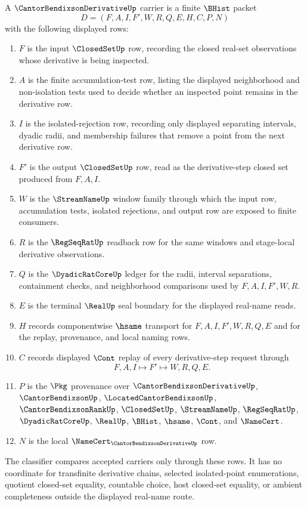 \begin{definition}
\label{def:cantor-bendixson-derivative-carrier}
A $\CantorBendixsonDerivativeUp$ carrier is a finite $\BHist$ packet
$$
D=(F,A,I,F',W,R,Q,E,H,C,P,N)
$$
with the following displayed rows:
\begin{enumerate}
\item $F$ is the input $\ClosedSetUp$ row, recording the closed real-set observations whose derivative is being inspected.
\item $A$ is the finite accumulation-test row, listing the displayed neighborhood and non-isolation tests used to decide whether an inspected point remains in the derivative row.
\item $I$ is the isolated-rejection row, recording only displayed separating intervals, dyadic radii, and membership failures that remove a point from the next derivative row.
\item $F'$ is the output $\ClosedSetUp$ row, read as the derivative-step closed set produced from $F,A,I$.
\item $W$ is the $\StreamNameUp$ window family through which the input row, accumulation tests, isolated rejections, and output row are exposed to finite consumers.
\item $R$ is the $\RegSeqRatUp$ readback row for the same windows and stage-local derivative observations.
\item $Q$ is the $\DyadicRatCoreUp$ ledger for the radii, interval separations, containment checks, and neighborhood comparisons used by $F,A,I,F',W,R$.
\item $E$ is the terminal $\RealUp$ seal boundary for the displayed real-name reads.
\item $H$ records componentwise $\hsame$ transport for $F,A,I,F',W,R,Q,E$ and for the replay, provenance, and local naming rows.
\item $C$ records displayed $\Cont$ replay of every derivative-step request through
$$
F,A,I \longmapsto F' \longmapsto W,R,Q,E .
$$
\item $P$ is the $\Pkg$ provenance over $\CantorBendixsonDerivativeUp$, $\CantorBendixsonUp$, $\LocatedCantorBendixsonUp$, $\CantorBendixsonRankUp$, $\ClosedSetUp$, $\StreamNameUp$, $\RegSeqRatUp$, $\DyadicRatCoreUp$, $\RealUp$, $\BHist$, $\hsame$, $\Cont$, and $\NameCert$.
\item $N$ is the local $\NameCert_{\CantorBendixsonDerivativeUp}$ row.
\end{enumerate}
The classifier compares accepted carriers only through these rows. It has no coordinate for transfinite derivative chains, selected isolated-point enumerations, quotient closed-set equality, countable choice, host closed-set equality, or ambient completeness outside the displayed real-name route.
\end{definition}

